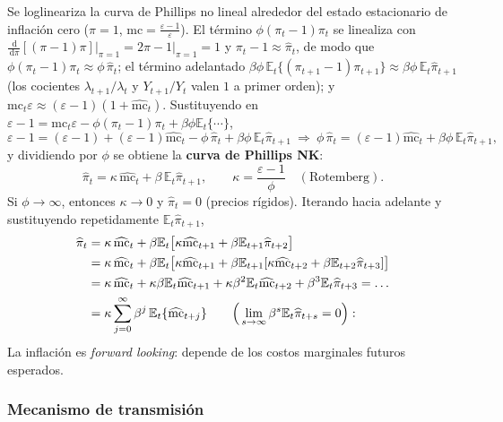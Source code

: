 \documentclass[11pt]{article}
\theoremstyle{definition}
\newcommand{\E}{\mathbb{E}}
\newcommand{\dd}{\,\mathrm{d}}
\newcommand{\mc}{\mathrm{mc}}
\begin{document}
Se loglineariza la curva de Phillips no lineal alrededor del estado estacionario de inflación cero
($\pi=1$, $\mc=\tfrac{\varepsilon-1}{\varepsilon}$). El término $\phi(\pi_{t}-1)\pi_{t}$ se linealiza con
$\tfrac{\dd}{\dd\pi}[(\pi-1)\pi]\big|_{\pi=1}=2\pi-1\big|_{\pi=1}=1$ y $\pi_{t}-1\approx\widehat{\pi}_{t}$,
de modo que $\phi(\pi_{t}-1)\pi_{t}\approx\phi\,\widehat{\pi}_{t}$; el término adelantado
$\beta\phi\,\E_{t}\{(\pi_{t+1}-1)\pi_{t+1}\}\approx\beta\phi\,\E_{t}\widehat{\pi}_{t+1}$ (los cocientes
$\lambda_{t+1}/\lambda_{t}$ y $Y_{t+1}/Y_{t}$ valen $1$ a primer orden); y $\mc_{t}\varepsilon\approx
(\varepsilon-1)(1+\widehat{\mc}_{t})$. Sustituyendo en $\varepsilon-1=\mc_{t}\varepsilon-\phi(\pi_{t}-1)\pi_{t}+\beta\phi\E_{t}\{\cdots\}$,
\begin{equation}
\varepsilon-1=(\varepsilon-1)+(\varepsilon-1)\widehat{\mc}_{t}-\phi\,\widehat{\pi}_{t}+\beta\phi\,\E_{t}\widehat{\pi}_{t+1}
\ \Longrightarrow\
\phi\,\widehat{\pi}_{t}=(\varepsilon-1)\widehat{\mc}_{t}+\beta\phi\,\E_{t}\widehat{\pi}_{t+1},
\end{equation}
y dividiendo por $\phi$ se obtiene la \textbf{curva de Phillips NK}:
\begin{equation}
\widehat{\pi}_{t}=\kappa\,\widehat{\mc}_{t}+\beta\,\E_{t}\widehat{\pi}_{t+1},
\qquad
\kappa=\frac{\varepsilon-1}{\phi}\quad(\text{Rotemberg}).
\end{equation}
Si $\phi\to\infty$, entonces $\kappa\to0$ y $\widehat{\pi}_{t}=0$ (precios rígidos). Iterando hacia
adelante y sustituyendo repetidamente $\E_{t}\widehat{\pi}_{t+1}$,
\begin{align}
\widehat{\pi}_{t}&=\kappa\,\widehat{\mc}_{t}+\beta\E_{t}\big[\kappa\widehat{\mc}_{t+1}+\beta\E_{t+1}\widehat{\pi}_{t+2}\big] \notag\\
&=\kappa\,\widehat{\mc}_{t}+\beta\E_{t}\big[\kappa\widehat{\mc}_{t+1}+\beta\E_{t+1}[\kappa\widehat{\mc}_{t+2}+\beta\E_{t+2}\widehat{\pi}_{t+3}]\big] \notag\\
&=\kappa\,\widehat{\mc}_{t}+\kappa\beta\E_{t}\widehat{\mc}_{t+1}+\kappa\beta^{2}\E_{t}\widehat{\mc}_{t+2}+\beta^{3}\E_{t}\widehat{\pi}_{t+3}
=\dots \notag\\
&=\kappa\sum_{j=0}^{\infty}\beta^{j}\,\E_{t}\{\widehat{\mc}_{t+j}\}
\qquad\Big(\lim_{s\to\infty}\beta^{s}\E_{t}\widehat{\pi}_{t+s}=0\Big):
\end{align}
La inflación es \emph{forward looking}: depende de los costos marginales futuros esperados.

\subsubsection{Mecanismo de transmisión}
\end{document}
